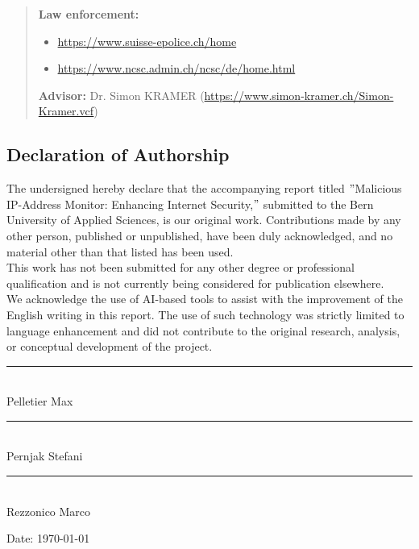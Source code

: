 \documentclass{article}
\begin{document}
\begin{quote}
        \textbf{Law enforcement:}
        \begin{itemize}
            \item \url{https://www.suisse-epolice.ch/home}
            \item \url{https://www.ncsc.admin.ch/ncsc/de/home.html}
        \end{itemize}

        \textbf{Advisor:}
        Dr. Simon KRAMER (\url{https://www.simon-kramer.ch/Simon-Kramer.vcf})
    \end{quote}


    \newpage
    \subsection{Declaration of Authorship}\label{subsec:declaration-of-authorship}
    The undersigned hereby declare that the accompanying report titled \("\)Malicious IP-Address Monitor: Enhancing Internet Security,\("\) submitted to the Bern University of Applied Sciences, is our original work.
    Contributions made by any other person, published or unpublished, have been duly acknowledged, and no material other than that listed has been used.\\

    \noindent This work has not been submitted for any other degree or professional qualification and is not currently being considered for publication elsewhere.\\

    \noindent We acknowledge the use of AI-based tools to assist with the improvement of the English writing in this report.
    The use of such technology was strictly limited to language enhancement and did not contribute to the original research, analysis, or conceptual development of the project.

    \vspace{1cm}
    \noindent\rule{6cm}{0.4pt}\\
    Pelletier Max

    \vspace{1cm}
    \noindent\rule{6cm}{0.4pt}\\
    Pernjak Stefani

    \vspace{1cm}
    \noindent\rule{6cm}{0.4pt}\\
    Rezzonico Marco

    \vspace{1cm}
    \noindent Date: \today
\end{document}
